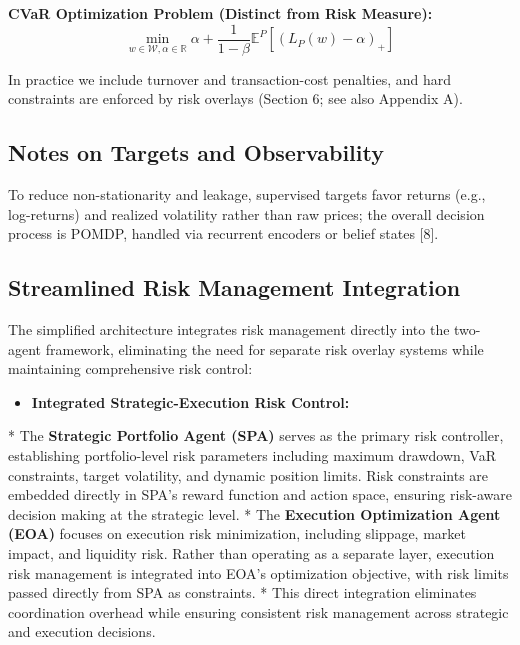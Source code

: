 \documentclass[11pt]{article}
\begin{document}
\textbf{CVaR Optimization Problem (Distinct from Risk Measure):}
\begin{equation}
\min_{w \in \mathcal{W}, \alpha \in \mathbb{R}} \alpha + \frac{1}{1-\beta}\mathbb{E}^P[(L_P(w) - \alpha)_+]
\end{equation}

In practice we include turnover and transaction-cost penalties, and hard constraints are enforced by risk overlays (Section 6; see also Appendix A).

\subsection{Notes on Targets and Observability}

To reduce non-stationarity and leakage, supervised targets favor returns (e.g., log-returns) and realized volatility rather than raw prices; the overall decision process is POMDP, handled via recurrent encoders or belief states [8].

\subsection{Streamlined Risk Management Integration}

The simplified architecture integrates risk management directly into the two-agent framework, eliminating the need for separate risk overlay systems while maintaining comprehensive risk control:

\begin{itemize}
\item   \textbf{Integrated Strategic-Execution Risk Control:}
\end{itemize}
    *   The \textbf{Strategic Portfolio Agent (SPA)} serves as the primary risk controller, establishing portfolio-level risk parameters including maximum drawdown, VaR constraints, target volatility, and dynamic position limits. Risk constraints are embedded directly in SPA's reward function and action space, ensuring risk-aware decision making at the strategic level.
    *   The \textbf{Execution Optimization Agent (EOA)} focuses on execution risk minimization, including slippage, market impact, and liquidity risk. Rather than operating as a separate layer, execution risk management is integrated into EOA's optimization objective, with risk limits passed directly from SPA as constraints.
    *   This direct integration eliminates coordination overhead while ensuring consistent risk management across strategic and execution decisions.
\end{document}
